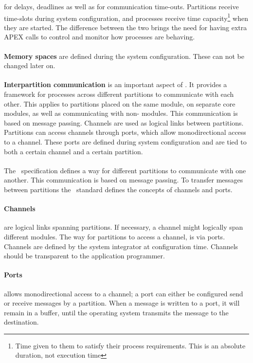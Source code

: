 for delays, deadlines as well as for communication time-outs.
Partitions receive time-slots during system configuration, and
processes receive time capacity\footnote{Time given to them to satisfy
their process requirements. This is an absolute duration, not execution time} when they are started.
The difference between the two brings the need for having extra APEX calls
to control and monitor how processes are behaving\cite{arinc_page_25}.
\\\\
\textbf{Memory spaces}
are defined during the system configuration. These can not
be changed later on.
\\\\
\textbf{Interpartition communication}
is an important aspect of \arinc{}. It provides a framework for processes across different partitions
to communicate with each other. This applies to partitions placed
on the same module, on separate core modules, as well as communicating with non-\arinc{} modules.
This communication is based on message passing. Channels are used as
logical links between partitions. Partitions can access channels through
ports, which allow monodirectional access to a channel\cite{arinc_page_27}.
These ports are defined during system configuration and are tied to
both a certain channel and a certain partition.
\\\\
\iffalse
The \arinc\ specification defines a way for different partitions to communicate with one another.
This communication is based on message passing. To transfer messages between partitions the \arinc\ standard
defines the concepts of channels and ports.

\paragraph{Channels} are logical links spanning partitions. If necessary,
a channel might logically span different modules.
The way for partitions to access a channel, is via ports.
Channels are defined by the system integrator at configuration time.
Channels should be transparent to the application programmer.

\paragraph{Ports} allows monodirectional access to a channel;
a port can either be configured send or receive messages by a partition.
When a message is written to a port, it will remain in a buffer, until the operating system transmits the message to the destination.\\

